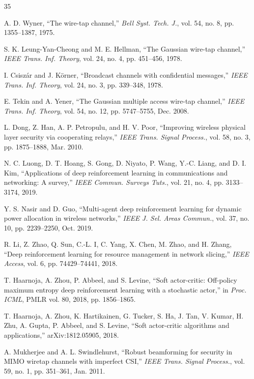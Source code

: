 \documentclass[conference]{IEEEtran}
\begin{document}
\begin{thebibliography}{35}

A. D. Wyner, ``The wire-tap channel,'' \emph{Bell Syst. Tech. J.}, vol. 54, no. 8, pp. 1355--1387, 1975.

S. K. Leung-Yan-Cheong and M. E. Hellman, ``The Gaussian wire-tap channel,'' \emph{IEEE Trans. Inf. Theory}, vol. 24, no. 4, pp. 451--456, 1978.

I. Csisz\'ar and J. K\"orner, ``Broadcast channels with confidential messages,'' \emph{IEEE Trans. Inf. Theory}, vol. 24, no. 3, pp. 339--348, 1978.

E. Tekin and A. Yener, ``The Gaussian multiple access wire-tap channel,'' \emph{IEEE Trans. Inf. Theory}, vol. 54, no. 12, pp. 5747--5755, Dec. 2008.

L. Dong, Z. Han, A. P. Petropulu, and H. V. Poor, ``Improving wireless physical layer security via cooperating relays,'' \emph{IEEE Trans. Signal Process.}, vol. 58, no. 3, pp. 1875--1888, Mar. 2010.

N. C. Luong, D. T. Hoang, S. Gong, D. Niyato, P. Wang, Y.-C. Liang, and D. I. Kim, ``Applications of deep reinforcement learning in communications and networking: A survey,'' \emph{IEEE Commun. Surveys Tuts.}, vol. 21, no. 4, pp. 3133--3174, 2019.

Y. S. Nasir and D. Guo, ``Multi-agent deep reinforcement learning for dynamic power allocation in wireless networks,'' \emph{IEEE J. Sel. Areas Commun.}, vol. 37, no. 10, pp. 2239--2250, Oct. 2019.

R. Li, Z. Zhao, Q. Sun, C.-L. I, C. Yang, X. Chen, M. Zhao, and H. Zhang, ``Deep reinforcement learning for resource management in network slicing,'' \emph{IEEE Access}, vol. 6, pp. 74429--74441, 2018.

T. Haarnoja, A. Zhou, P. Abbeel, and S. Levine, ``Soft actor-critic: Off-policy maximum entropy deep reinforcement learning with a stochastic actor,'' in \emph{Proc. ICML}, PMLR vol. 80, 2018, pp. 1856--1865.

T. Haarnoja, A. Zhou, K. Hartikainen, G. Tucker, S. Ha, J. Tan, V. Kumar, H. Zhu, A. Gupta, P. Abbeel, and S. Levine, ``Soft actor-critic algorithms and applications,'' arXiv:1812.05905, 2018.

A. Mukherjee and A. L. Swindlehurst, ``Robust beamforming for security in MIMO wiretap channels with imperfect CSI,'' \emph{IEEE Trans. Signal Process.}, vol. 59, no. 1, pp. 351--361, Jan. 2011.


\end{thebibliography}
\end{document}
